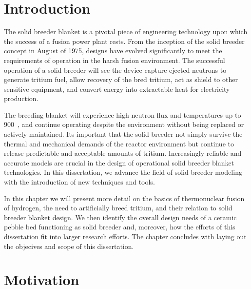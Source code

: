 \chapter{Introduction} \label{sec:introduction}
The solid breeder blanket is a pivotal piece of engineering technology upon which the success of a fusion power plant rests. From the inception of the solid breeder concept in August of 1975, designs have evolved significantly to meet the requirements of operation in the harsh fusion environment. The successful operation of a solid breeder will see the device capture ejected neutrons to generate tritium fuel, allow recovery of the bred tritium, act as shield to other sensitive equipment, and convert energy into extractable heat for electricity production.

The breeding blanket will experience high neutron flux and temperatures up to 900~\celsius, and continue operating despite the environment without being replaced or actively maintained. Its important that the solid breeder not simply survive the thermal and mechanical demands of the reactor environment but continue to release predictable and acceptable amounts of tritium. Increasingly reliable and accurate models are crucial in the design of operational solid breeder blanket technologies. In this dissertation, we advance the field of solid breeder modeling with the introduction of new techniques and tools.

In this chapter we will present more detail on the basics of thermonuclear fusion of hydrogen, the need to artificially breed tritium, and their relation to solid breeder blanket design. We then identify the overall design needs of a ceramic pebble bed functioning as solid breeder and, moreover, how the efforts of this dissertation fit into larger research efforts. The chapter concludes with laying out the objecives and scope of this dissertation.



%


\chapter{Motivation}\label{sec:motivation}




